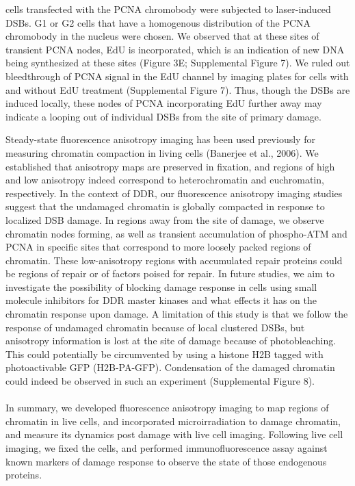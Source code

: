 cells transfected with the PCNA chromobody were subjected to laser-induced DSBs. G1 or G2 cells that have a homogenous distribution of the PCNA chromobody in the nucleus were chosen. We observed that at these sites of transient PCNA nodes, EdU is incorporated, which is an indication of new DNA being synthesized at these sites (Figure 3E; Supplemental Figure 7). We ruled out bleedthrough of PCNA signal in the EdU channel by imaging plates for cells with and without EdU treatment (Supplemental Figure 7). Thus, though the DSBs are induced locally, these nodes of PCNA incorporating EdU further away may indicate a looping out of individual DSBs from the site of primary damage.


Steady-state fluorescence anisotropy imaging has been used previously for measuring chromatin compaction in living cells (Banerjee et al., 2006). We established that anisotropy maps are preserved in fixation, and regions of high and low anisotropy indeed correspond to heterochromatin and euchromatin, respectively. In the context of DDR, our fluorescence anisotropy imaging studies suggest that the undamaged chromatin is globally compacted in response to localized DSB damage. In regions away from the site of damage, we observe chromatin nodes forming, as well as transient accumulation of phospho-ATM and PCNA in specific sites that correspond to more loosely packed regions of chromatin. These low-anisotropy regions with accumulated repair proteins could be regions of repair or of factors poised for repair. In future studies, we aim to investigate the possibility of blocking damage response in cells using small molecule inhibitors for DDR master kinases and what effects it has on the chromatin response upon damage. A limitation of this study is that we follow the response of undamaged chromatin because of local clustered DSBs, but anisotropy information is lost at the site of damage because of photobleaching. This could potentially be circumvented by using a histone H2B tagged with photoactivable GFP (H2B-PA-GFP). Condensation of the damaged chromatin could indeed be observed in such an experiment (Supplemental Figure 8).



\paragraph*{} In summary, we developed fluorescence anisotropy imaging to map regions of chromatin in live cells, and incorporated microirradiation to damage chromatin, and measure its dynamics post damage with live cell imaging. Following live cell imaging, we fixed the cells, and performed immunofluorescence assay against known markers of damage response to observe the state of those endogenous proteins.
